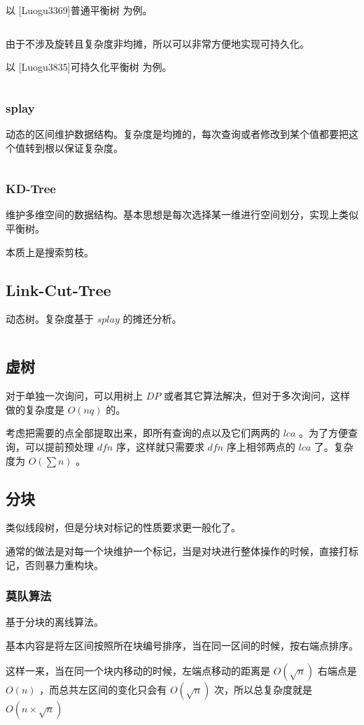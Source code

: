 \documentclass[UTF-8]{ctexart}
\newcommand{\cpp}[1]{\inputminted[bgcolor=bg,breaklines,breakanywhere=true]{c++}{#1}}
\begin{document}
			以 [Luogu3369]普通平衡树 为例。
			\cpp{code/Example/Luogu3369.cpp}
	
			由于不涉及旋转且复杂度非均摊，所以可以非常方便地实现可持久化。
			
			以 [Luogu3835]可持久化平衡树 为例。
			\cpp{code/Example/Luogu3835.cpp}
			\subsubsection{splay}
			动态的区间维护数据结构。复杂度是均摊的，每次查询或者修改到某个值都要把这个值转到根以保证复杂度。
			\cpp{code//DataStruct//splay.cpp}
			\subsubsection{KD-Tree}
			维护多维空间的数据结构。基本思想是每次选择某一维进行空间划分，实现上类似平衡树。
	
			本质上是搜索剪枝。
		\subsection{Link-Cut-Tree}
		动态树。复杂度基于 $splay$ 的摊还分析。
		\cpp{code//DataStruct//lct.cpp}
		\subsection{虚树}
		对于单独一次询问，可以用树上 $DP$ 或者其它算法解决，但对于多次询问，这样做的复杂度是 $O(nq)$ 的。
	
		考虑把需要的点全部提取出来，即所有查询的点以及它们两两的 $lca$ 。为了方便查询，可以提前预处理 $dfn$ 序，这样就只需要求 $dfn$ 序上相邻两点的 $lca$ 了。复杂度为 $O(\sum n)$ 。
		\subsection{分块}
		类似线段树，但是分块对标记的性质要求更一般化了。
		
		通常的做法是对每一个块维护一个标记，当是对块进行整体操作的时候，直接打标记，否则暴力重构块。
			\subsubsection{莫队算法}
			基于分块的离线算法。
			
			基本内容是将左区间按照所在块编号排序，当在同一区间的时候，按右端点排序。
			
			这样一来，当在同一个块内移动的时候，左端点移动的距离是 $O(\sqrt{n})$ 右端点是 $O(n)$ ，而总共左区间的变化只会有 $O(\sqrt{n})$ 次，所以总复杂度就是 $O(n \times \sqrt{n})$
			
\end{document}
